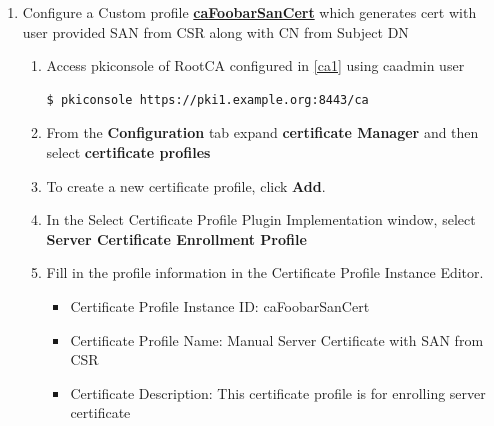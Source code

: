 \documentclass[a4paper]{article}
\begin{document}
\begin{enumerate}[label*=\arabic*.]
\begin{enumerate}[label*=\arabic*.]
\begin{lstlisting}
[CA]
pki_clone=True
pki_clone_pkcs12_password=Secret123
pki_clone_pkcs12_path=/tmp/ca_backup_keys.p12
pki_clone_replicate_schema=True
pki_clone_uri=https://pki1.example.org:8443
#Directory Server
pki_ds_password=Secret123
pki_ds_hostname=pki2.example.org
pki_ds_ldap_port=389
pki_ds_base_dn=o=Example1-RootCA-CA
pki_clone_replication_master_port=389
pki_clone_replication_clone_port=389
pki_ds_secure_connection=False
pki_ds_remove_data=True
                    \end{lstlisting}
                    \begin{lstlisting}[style=bashInputStyle]
$ pkispawn -s CA -f ca-clone-inst.inf -vv 
                    \end{lstlisting}
            \end{enumerate}
        \item Configure a Custom profile \textbf{\underline{caFoobarSanCert}} which generates cert with user provided SAN from CSR
                        along with CN from Subject DN
            \begin{enumerate}[label*=\arabic*.]
                \item Access pkiconsole of RootCA configured in \ref{ca1} using caadmin user
                    \begin{lstlisting}[style=bashInputStyle]
$ pkiconsole https://pki1.example.org:8443/ca                     
                    \end{lstlisting}
                \item From the \textbf{Configuration} tab expand \textbf{certificate Manager} and then select \textbf{certificate profiles}
                \item To create a new certificate profile, click \textbf{Add}.
                \item In the Select Certificate Profile Plugin Implementation window, 
                    select \textbf{Server Certificate Enrollment Profile}
                \item Fill in the profile information in the Certificate Profile Instance Editor.
                    \begin{itemize}
                        \item Certificate Profile Instance ID: caFoobarSanCert
                        \item Certificate Profile Name: Manual Server Certificate with SAN from CSR
                        \item Certificate Description: This certificate profile is for enrolling server certificate

\end{itemize}
\end{enumerate}
\end{enumerate}
\end{document}
